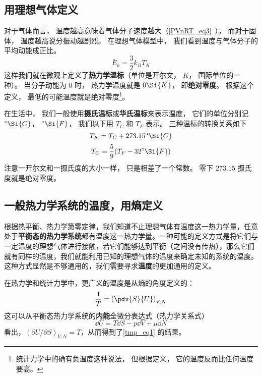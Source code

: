 

\subsection{用理想气体定义}
对于气体而言， 温度越高意味着气体分子速度越大（\autoref{PVnRT_eq3}~）， 而对于固体， 温度越高说分振动越剧烈。 在理想气体模型中， 我们看到温度与气体分子的平均动能成正比。 
\begin{equation}
\bar E_k = \frac{3}{2} k_B T_K
\end{equation}
这样我们就在微观上定义了\textbf{热力学温标}（单位是开尔文， $K$， 国际单位的一种）。 当分子动能为 0 时， 热力学温度就是 $0 \Si{K}$， 即\textbf{绝对零度}。 根据这个定义， 最低的可能温度就是绝对零度\footnote{统计力学中的确有负温度这种说法， 但根据定义， 它的温度反而比任何温度要高。}。

在生活中， 我们一般使用\textbf{摄氏温标}或\textbf{华氏温标}来表示温度， 它们的单位分别记 $^\circ\Si{C}$， $^\circ\Si{F}$， 我们以下用 $T_C$ 和 $T_F$ 表示。 三种温标的转换关系如下
\begin{equation}
T_K = T_C + 273.15^\circ\Si{C}
\end{equation}
\begin{equation}
T_C = \frac{5}{9}(T_F - 32^\circ\Si{F})
\end{equation}
注意一开尔文和一摄氏度的大小一样， 只是相差了一个常数。 零下 $273.15$ 摄氏度就是绝对零度。

\subsection{一般热力学系统的温度，用熵定义}
根据热平衡、热力学第零定律，我们知道不止理想气体有温度这一热力学量，任意处于\textbf{平衡态的热力学系统}都有温度这一热力学量。一种可能的定义方式是将它们与一定温度的理想气体进行接触，若它们能够达到平衡（之间没有传热），那么它们就有同样的温度，我们就能利用已知的理想气体的温度来确定未知的系统的温度。这种方式显然是不够通用的，我们需要寻求\textbf{温度}的更加通用的定义。

在热力学和统计力学中，更广义的温度是从熵的角度定义的：
\begin{equation}\label{tmp_eq1}
\frac{1}{T} = \left(\pdv{S}{U}\right)_{V,N} 
\end{equation}
这可以从平衡态热力学系统的\textbf{内能}全微分表达式（热力学关系式）
\begin{equation}
\dd U=T\dd S-p\dd V+\mu \dd N
\end{equation}
看出，$(\partial U/\partial S)_{V,N}=T$，从而得到了\autoref{tmp_eq1} 的结果。

